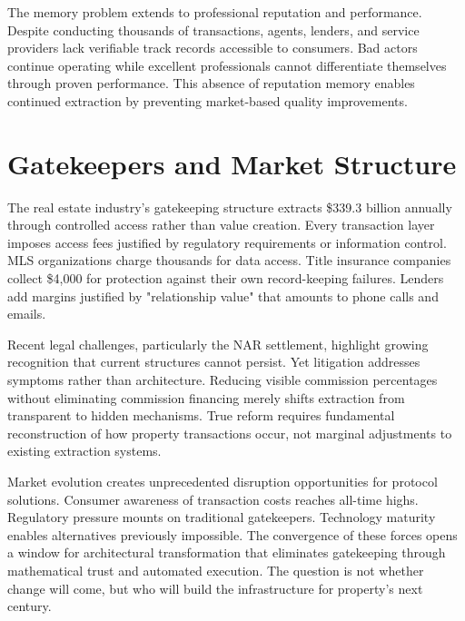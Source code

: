 The memory problem extends to professional reputation and performance. Despite conducting thousands of transactions, agents, lenders, and service providers lack verifiable track records accessible to consumers. Bad actors continue operating while excellent professionals cannot differentiate themselves through proven performance. This absence of reputation memory enables continued extraction by preventing market-based quality improvements.

\section{Gatekeepers and Market Structure}

The real estate industry's gatekeeping structure extracts \$339.3 billion annually through controlled access rather than value creation. Every transaction layer imposes access fees justified by regulatory requirements or information control. MLS organizations charge thousands for data access. Title insurance companies collect \$4{,}000 for protection against their own record-keeping failures. Lenders add margins justified by "relationship value" that amounts to phone calls and emails.

Recent legal challenges, particularly the NAR settlement, highlight growing recognition that current structures cannot persist. Yet litigation addresses symptoms rather than architecture. Reducing visible commission percentages without eliminating commission financing merely shifts extraction from transparent to hidden mechanisms. True reform requires fundamental reconstruction of how property transactions occur, not marginal adjustments to existing extraction systems.

Market evolution creates unprecedented disruption opportunities for protocol solutions. Consumer awareness of transaction costs reaches all-time highs. Regulatory pressure mounts on traditional gatekeepers. Technology maturity enables alternatives previously impossible. The convergence of these forces opens a window for architectural transformation that eliminates gatekeeping through mathematical trust and automated execution. The question is not whether change will come, but who will build the infrastructure for property's next century.